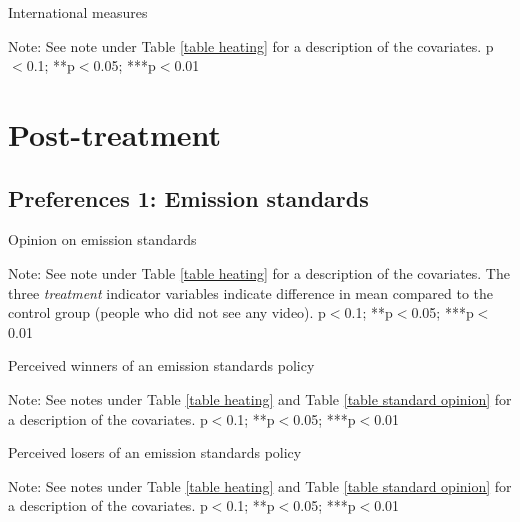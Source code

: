 \documentclass{article}
\begin{document}
\begin{landscape}
	\begin{table}[h!]
	\caption{International measures}
	\begin{center}
		\scalebox{0.6}{}
	\end{center}
	{\footnotesize Note: See note under Table \ref{table heating} for a description of the covariates.
	\newline *p$<$0.1; **p$<$0.05; ***p$<$0.01}
\end{table}	
\end{landscape}


\clearpage
\section{Post-treatment}
\subsection{Preferences 1: Emission standards}

\begin{table}[h!]
	\caption{Opinion on emission standards} \label{table standard opinion}
	\begin{center}
		\scalebox{0.7}{}
	\end{center}
	{\footnotesize Note: See note under Table \ref{table heating} for a description of the covariates. The three \textit{treatment} indicator variables indicate difference in mean compared to the control group (people who did not see any video).
	\newline *p$<$0.1; **p$<$0.05; ***p$<$0.01}
\end{table}	

\begin{table}[h!]
	\caption{Perceived winners of an emission standards policy}
	\begin{center}
		\scalebox{0.7}{}
	\end{center}
	{\footnotesize Note: See notes under Table \ref{table heating} and Table \ref{table standard opinion} for a description of the covariates.
	\newline *p$<$0.1; **p$<$0.05; ***p$<$0.01}
\end{table}	

\begin{table}[h!]
	\caption{Perceived losers of an emission standards policy}
	\begin{center}
		\scalebox{0.7}{}
	\end{center}
	{\footnotesize Note: See notes under Table \ref{table heating} and Table \ref{table standard opinion} for a description of the covariates.
	\newline *p$<$0.1; **p$<$0.05; ***p$<$0.01}
\end{table}	
\end{document}
